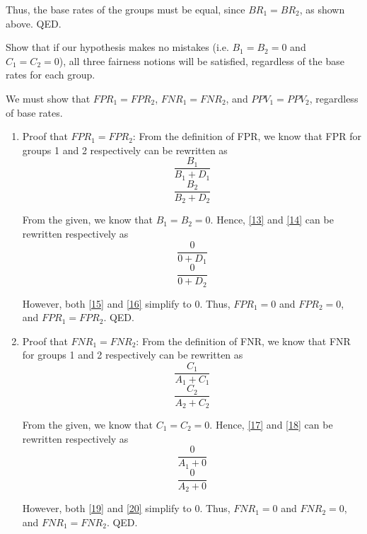 \documentclass{cisXXX} %
\begin{document}
Thus, the base rates of the groups must be equal, since $BR_1 = BR_2$, as shown above. QED.

\HWproblem
Show that if our hypothesis makes no mistakes (i.e. $B_1 = B_2 = 0$ and $C_1 = C_2 = 0$), all three fairness notions will be satisfied, regardless of the base rates for each group.

We must show that $FPR_1 = FPR_2$, $FNR_1 = FNR_2$, and $PPV_1 = PPV_2$, regardless of base rates.

\begin{enumerate}
\item Proof that $FPR_1 = FPR_2$:
From the definition of FPR, we know that FPR for groups 1 and 2 respectively can be rewritten as
\begin{equation}
\label{13} \frac{B_1}{B_1 + D_1}
\end{equation}
\begin{equation}
\label{14} \frac{B_2}{B_2 + D_2}
\end{equation}

From the given, we know that $B_1 = B_2 = 0$. Hence, \eqref{13} and \eqref{14} can be rewritten respectively as
\begin{equation}
\label{15} \frac{0}{0 + D_1}
\end{equation}
\begin{equation}
\label{16} \frac{0}{0 + D_2}
\end{equation}

However, both \eqref{15} and \eqref{16} simplify to $0$. Thus, $FPR_1 = 0$ and $FPR_2 = 0$, and $FPR_1 = FPR_2$. QED.

\item Proof that $FNR_1 = FNR_2$:
From the definition of FNR, we know that FNR for groups 1 and 2 respectively can be rewritten as
\begin{equation}
\label{17} \frac{C_1}{A_1 + C_1}
\end{equation}
\begin{equation}
\label{18} \frac{C_2}{A_2 + C_2}
\end{equation}

From the given, we know that $C_1 = C_2 = 0$. Hence, \eqref{17} and \eqref{18} can be rewritten respectively as
\begin{equation}
\label{19} \frac{0}{A_1 + 0}
\end{equation}
\begin{equation}
\label{20} \frac{0}{A_2 + 0}
\end{equation}

However, both \eqref{19} and \eqref{20} simplify to $0$. Thus, $FNR_1 = 0$ and $FNR_2 = 0$, and $FNR_1 = FNR_2$. QED.


\end{enumerate}
\end{document}

